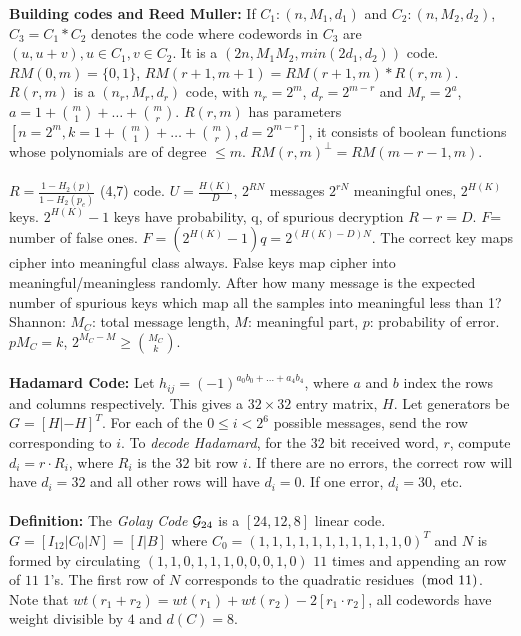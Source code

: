 {\bf Building codes and Reed Muller:} If $C_1 : (n, M_1, d_1 )$ and
$C_2 : (n, M_2, d_2 )$, $C_3 = C_1 * C_2$ denotes the code where codewords
in $C_3$ are $(u, u+v),
u \in  C_1 , v \in  C_2 $.  It is a
$(2n, M_1 M_2 , min(2 d_1 , d_2 ))$ code.
$RM(0,m)= \{ 0 , 1 \}$, $RM(r+1, m+1)=  RM(r+1, m) * R(r, m)$. $R(r, m)$ is
a $(n_r , M_r , d_r )$ code, with $n_r = 2^m$, $d_r = 2^{m-r}$ and
$M_r = 2^a$, $a= 1 + {m \choose 1} + \ldots + {m \choose r}$.  $R(r,m)$
has parameters
$[n=2^m , k= 1 + {m \choose 1} + \ldots + {m \choose r}, d=2^{m-r}]$,
it consists of boolean functions
whose polynomials are of degree 
$\leq m$. $RM(r,m)^{\perp} = RM(m-r-1,
m)$.
\\
\\
$R= \frac {1-H_2 (p)} {1- H_2 (p_e )}$ (4,7) code.
$ U= {\frac {H(K)} {D}}$, $2^{RN}$ messages $2^{rN}$ meaningful ones,
$2^{H(K)}$ keys.  $2^{H(K)}-1$ keys have probability, q, of spurious
decryption $R-r=D$. $F$= number of false ones.
$F=(2^{H(K)}-1)q= 2^{(H(K)-D)N}$.  The correct key maps cipher into
meaningful class always.  False keys map cipher into meaningful/meaningless
randomly.  After how many message is the expected number of spurious keys
which map all the samples into meaningful less than 1?
Shannon: $M_{C}$: total message length, $M$: meaningful part,
$p$: probability of error.  $p M_{C}= k$, $2^{M_{C}-M} \geq
{{M_{C}} \choose {k}}.$\\
\\
{\bf Hadamard Code:}  Let $h_{ij}= (-1)^{a_0 b_0 + \ldots + a_4 b_4}$,
where $a$ and $b$ index the rows and columns respectively.  This gives a
$32 \times 32$ entry matrix, $H$.  Let generators be $G= [H |  -H]^T$.
For each of the $0 \le i <2^6$ possible messages, send the row corresponding to 
$i$.
To \emph {decode Hadamard}, for the $32$ bit received word, $r$, compute $d_i= r \cdot R_i$,
where $R_i$ is the $32$ bit row $i$.  If there are no errors, the correct row will
have $d_i=32$ and all other rows will have $d_i=0$.  If one error, $d_i=30$, etc.
\\
\\
{\bf Definition:} The
\emph{Golay Code} ${\cal G}_{24}$ is a $[24, 12,8]$ linear code. 
$G= [I_{12} | C_0 | N] = [I | B]$ 
where $C_0= (1,1,1,1,1,1,1,1,1,1,1,0)^T$
and $N$ is formed by circulating $(1, 1, 0, 1, 1, 1, 0, 0, 0, 1, 0)$
$11$ times and appending an row of $11$ 1's.
The first row of $N$ corresponds to the quadratic residues $\thinspace \textnormal{(mod } 11 \textnormal{)}$.
Note that $wt(r_1 + r_2) = wt(r_1) + wt(r_2) - 2 [r_1 \cdot r_2]$,
all codewords have weight divisible by $4$ and $d(C)=8$.  
